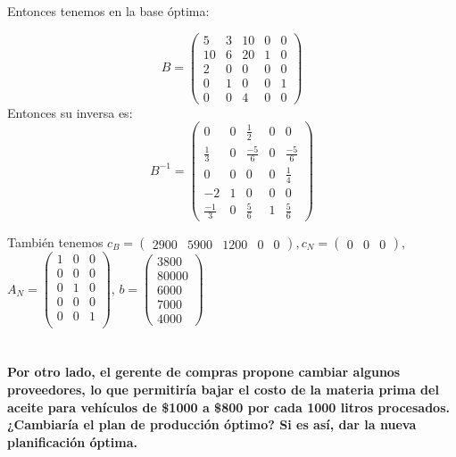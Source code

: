 \documentclass[10pt,a4paper]{article}
\begin{document}
Entonces tenemos en la base óptima:

\[B = \begin{pmatrix}
	5  & 3 & 10 & 0 & 0 \\
	10 & 6 & 20 & 1 & 0 \\
	2  & 0 & 0  & 0 & 0 \\
	0  & 1 & 0  & 0 & 1 \\
	0  & 0 & 4  & 0 & 0
\end{pmatrix}\]
Entonces su inversa es:
\[B^{-1} = \begin{pmatrix}
	0  & 0 &\frac{1}{2} & 0 & 0 \\
	\frac{1}{3} & 0 & \frac{-5}{6} & 0 & \frac{-5}{6} \\
	0  & 0 & 0  & 0 & \frac{1}{4} \\
	-2 & 1 & 0  & 0 & 0 \\
	\frac{-1}{3}  & 0 & \frac{5}{6}  & 1 & \frac{5}{6}
\end{pmatrix}\]

También tenemos $c_B = \begin{pmatrix} 2900 & 5900 & 1200 & 0 & 0 \end{pmatrix}, c_N = \begin{pmatrix} 0 & 0 & 0 \end{pmatrix}$, $A_N = \begin{pmatrix}
	1 & 0 & 0 \\
	0 & 0 & 0 \\
	0 & 1 & 0 \\
	0 & 0 & 0 \\
	0 & 0 & 1 \\
\end{pmatrix}$, $b = \begin{pmatrix}
3800 \\
80000 \\
6000 \\
7000 \\
4000
\end{pmatrix}$

\section{} %
\section{} %
\section{} %
\section{} %
\textbf{Por otro lado, el gerente de compras propone cambiar algunos proveedores, lo que permitiría bajar el costo de la materia prima del aceite para vehículos de \$1000 a \$800 por cada 1000 litros procesados. ¿Cambiaría el plan de producción óptimo? Si es así, dar la nueva planificación óptima.}
\end{document}
